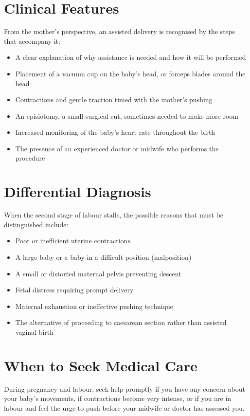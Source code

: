 \section*{Clinical Features}
From the mother's perspective, an assisted delivery is recognised by the steps that accompany it:
\begin{itemize}
    \item A clear explanation of why assistance is needed and how it will be performed
    \item Placement of a vacuum cup on the baby's head, or forceps blades around the head
    \item Contractions and gentle traction timed with the mother's pushing
    \item An episiotomy, a small surgical cut, sometimes needed to make more room
    \item Increased monitoring of the baby's heart rate throughout the birth
    \item The presence of an experienced doctor or midwife who performs the procedure
\end{itemize}

\section*{Differential Diagnosis}
When the second stage of labour stalls, the possible reasons that must be distinguished include:
\begin{itemize}
    \item Poor or inefficient uterine contractions
    \item A large baby or a baby in a difficult position (malposition)
    \item A small or distorted maternal pelvis preventing descent
    \item Fetal distress requiring prompt delivery
    \item Maternal exhaustion or ineffective pushing technique
    \item The alternative of proceeding to caesarean section rather than assisted vaginal birth
\end{itemize}

\section*{When to Seek Medical Care}
During pregnancy and labour, seek help promptly if you have any concern about your baby's movements, if contractions become very intense, or if you are in labour and feel the urge to push before your midwife or doctor has assessed you.

